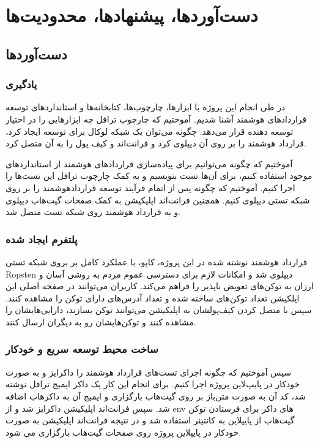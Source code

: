\chapter{دست‌آوردها، پیشنهاد‌ها، محدودیت‌ها}

\section{دست‌آوردها}

\subsection{یادگیری}
در طی انجام این پروژه با ابزارها، چارچوب‌ها، کتابخانه‌ها و استانداردهای توسعه قراردادهای هوشمند آشنا شدیم. آموختیم که چارچوب ترافل چه ابزارهایی را در اختیار توسعه دهنده قرار می‌دهد. چگونه می‌توان یک شبکه لوکال برای توسعه ایجاد کرد، قرارداد هوشمند را بر روی آن دیپلوی کرد و فرانت‌اند و کیف پول را به آن متصل کرد.

آموختیم که چگونه می‌توانیم برای پیاده‌سازی قراردادهای هوشمند از استانداردهای موجود استفاده کنیم، برای آن‌ها تست بنویسیم و به کمک چارچوب ترافل این تست‌ها را اجرا کنیم. آموختیم که چگونه پس از اتمام فرآیند توسعه قراردادهوشمند را بر روی شبکه تستی دیپلوی کنیم. همچنین فرانت‌اند اپلیکیشن به کمک صفحات گیت‌هاب دیپلوی و به قرارداد هوشمند روی شبکه تست متصل شد.

\subsection{پلتفرم ایجاد شده}
قرارداد هوشمند نوشته شده در این پروژه، کاپو، با عملکرد کامل بر بروی شبکه تستی Ropsten دیپلوی شد و امکانات لازم برای دسترسی عموم مردم به روشی آسان و ارزان به توکن‌های تعویض ناپذیر را فراهم می‌کند. کاربران می‌توانند در صفحه اصلی این اپلکیشن تعداد توکن‌های ساخته شده و تعداد آدرس‌های دارای توکن را مشاهده کنند. سپس با متصل کردن کیف‌پولشان به اپلیکیشن می‌توانند توکن بسازند، دارایی‌هایشان را مشاهده کنند و توکن‌هایشان رو به دیگران ارسال کنند.

\subsection{ساخت محیط توسعه سریع و خودکار}
سپس آموختیم که چگونه اجرای تست‌های قرارداد هوشمند را داکرایز و به صورت خودکار در پایپ‌لاین پروژه اجرا کنیم. برای انجام این کار یک داکر ایمیج ترافل نوشته شد، کد آن به صورت متن‌باز بر روی گیت‌هاب بارگزاری و ایمیج آن به داکرهاب اضافه شد. سپس فرانت‌اند اپلیکیشن داکرایز شد و از env های داکر برای فرستادن توکن گیت‌هاب از پایپلاین به کانتینر استفاده شد و در نتیجه فرانت‌اند اپلیکیشن به صورت خودکار در پایپلاین پروژه روی صفحات گیت‌هاب بارگزاری می شود.

